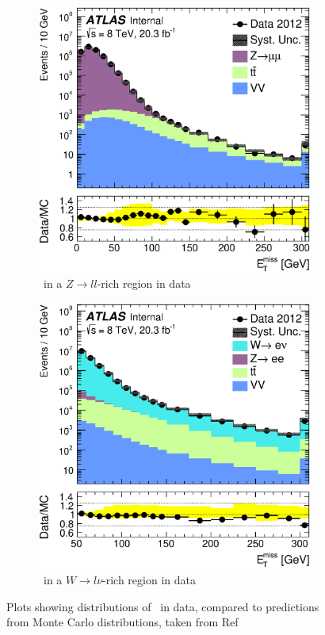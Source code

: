 \begin{figure}[!h]
\begin{subfigure}{0.5\textwidth}
   \includegraphics[width=\textwidth]{figures/zmmh_tot_MET.eps}
\caption{\met\ in a $Z\to ll$-rich region in data}
\label{fig:metPerfA}
\end{subfigure} %
\begin{subfigure}{0.5\textwidth}
   \includegraphics[width=\textwidth]{figures/wenh_tot_MET.eps}
\caption{\met\ in a $W\to l\nu$-rich region in data}
\label{fig:metPerfB}
\end{subfigure}
\caption{Plots showing distributions of \met\ in data, compared to predictions from Monte Carlo distributions, taken from 
Ref~\cite{Khoo:2012749}}
\end{figure}

